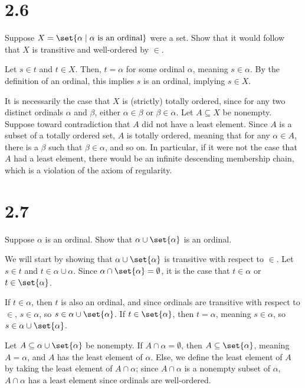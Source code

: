 \documentclass[10pt]{mypackage}
\begin{document}
\RaggedRight
\section{2.6}%
\begin{problem}
  Suppose $X = \set{\alpha\mid \alpha\text{ is an ordinal}}$ were a set. Show that it would follow that $X$ is transitive and well-ordered by $\in$.
\end{problem}
\begin{solution}
  Let $s\in t$ and $t\in X$. Then, $t = \alpha$ for some ordinal $\alpha$, meaning $s\in \alpha$. By the definition of an ordinal, this implies $s$ is an ordinal, implying $s\in X$.\newline

  It is necessarily the case that $X$ is (strictly) totally ordered, since for any two distinct ordinals $\alpha$ and $\beta$, either $\alpha \in \beta$ or $\beta \in \alpha$. Let $A\subseteq X$ be nonempty. Suppose toward contradiction that $A$ did not have a least element. Since $A$ is a subset of a totally ordered set, $A$ is totally ordered, meaning that for any $\alpha \in A$, there is a $\beta$ such that $\beta \in \alpha$, and so on. In particular, if it were not the case that $A$ had a least element, there would be an infinite descending membership chain, which is a violation of the axiom of regularity.
\end{solution}
\section{2.7}%
\begin{problem}
  Suppose $\alpha$ is an ordinal. Show that $\alpha \cup \set{\alpha}$ is an ordinal.
\end{problem}
\begin{solution}
  We will start by showing that $\alpha \cup \set{\alpha}$ is transitive with respect to $\in$. Let $s\in t$ and $t\in \alpha \cup \alpha$. Since $\alpha\cap \set{\alpha} = \emptyset$, it is the case that $t \in \alpha$ or $t\in \set{\alpha}$.\newline

  If $t\in \alpha$, then $t$ is also an ordinal, and since ordinals are transitive with respect to $\in$, $s\in \alpha$, so $s\in \alpha \cup \set{\alpha}$. If $t\in \set{\alpha}$, then $t = \alpha$, meaning $s \in \alpha$, so $s\in \alpha \cup \set{\alpha}$.\newline

  Let $A\subseteq \alpha \cup \set{\alpha}$ be nonempty. If $A\cap \alpha = \emptyset$, then $A \subseteq \set{\alpha}$, meaning $A = \alpha$, and $A$ has the least element of $\alpha$. Else, we define the least element of $A$ by taking the least element of $A\cap \alpha$; since $A\cap \alpha$ is a nonempty subset of $\alpha$, $A\cap \alpha$ has a least element since ordinals are well-ordered.
\end{solution}
\end{document}
